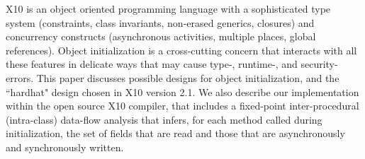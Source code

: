 X10 is an object oriented programming language with a sophisticated
    type system (constraints, class invariants, non-erased generics, closures)
    and concurrency constructs (asynchronous activities, multiple places, global references).
Object initialization is a cross-cutting concern that interacts with all these features
    in delicate ways that may cause type-, runtime-, and security- errors.
This paper discusses possible designs for object initialization,
    and the ``hardhat" design chosen in X10 version 2.1.
We also describe our implementation within the open source X10 compiler,
    that includes a
    fixed-point inter-procedural (intra-class)
    data-flow analysis
    that infers, for each method called during initialization,
    the set of fields that are read and
    those that are asynchronously and synchronously written.
